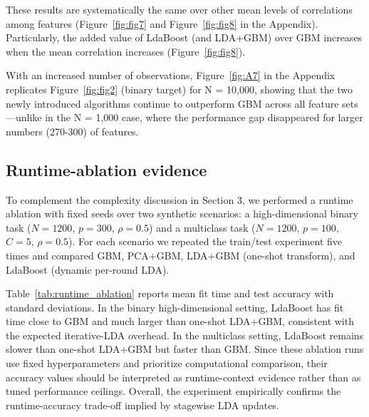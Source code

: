 \documentclass[11pt,a4paper]{article}
\begin{document}
These results are systematically the same over other mean levels of correlations among features (Figure~\ref{fig:fig7} and Figure~\ref{fig:fig8} in the Appendix). Particularly, the added value of LdaBoost (and LDA+GBM) over GBM increases when the mean correlation increases (Figure~\ref{fig:fig8}). 

With an increased number of observations, Figure~\ref{fig:A7} in the Appendix replicates Figure~\ref{fig:fig2} (binary target) for N = 10,000, showing that the two newly introduced algorithms continue to outperform GBM across all feature sets—unlike in the N = 1,000 case, where the performance gap disappeared for larger numbers (270-300) of features.

\subsection*{Runtime-ablation evidence}
To complement the complexity discussion in Section 3, we performed a runtime ablation with fixed seeds over two synthetic scenarios: a high-dimensional binary task ($N=1200$, $p=300$, $\rho=0.5$) and a multiclass task ($N=1200$, $p=100$, $C=5$, $\rho=0.5$). For each scenario we repeated the train/test experiment five times and compared GBM, PCA+GBM, LDA+GBM (one-shot transform), and LdaBoost (dynamic per-round LDA).

Table~\ref{tab:runtime_ablation} reports mean fit time and test accuracy with standard deviations. In the binary high-dimensional setting, LdaBoost has fit time close to GBM and much larger than one-shot LDA+GBM, consistent with the expected iterative-LDA overhead. In the multiclass setting, LdaBoost remains slower than one-shot LDA+GBM but faster than GBM. Since these ablation runs use fixed hyperparameters and prioritize computational comparison, their accuracy values should be interpreted as runtime-context evidence rather than as tuned performance ceilings. Overall, the experiment empirically confirms the runtime-accuracy trade-off implied by stagewise LDA updates.
\end{document}
